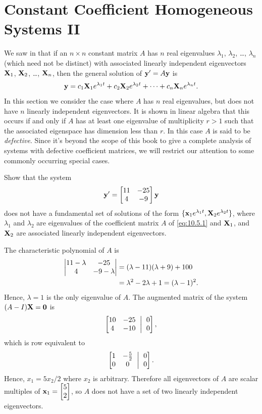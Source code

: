 \section{Constant Coefficient Homogeneous Systems II}
\label{sec:system_const_coeff_ii}

We saw in  that if an $n\times n$
constant matrix
$A$ has $n$ real eigenvalues $\lambda_1$, $\lambda_2$, \dots, $\lambda_n$
(which need not be distinct) with associated linearly independent
eigenvectors $\mathbf{X}_1$, $\mathbf{X}_2$, \dots, $\mathbf{X}_n$, then the general
solution of $\mathbf{y}'=A\mathbf{y}$ is
\[
\mathbf{y}=c_1\mathbf{X}_1e^{\lambda_1t}+c_2\mathbf{X}_2e^{\lambda_2 t}
+\cdots+c_n\mathbf{X}_ne^{\lambda_n t}.
\]
In this section we consider the case where $A$ has $n$ real
eigenvalues, but does not have $n$ linearly independent eigenvectors.
It is shown in linear algebra that this occurs if and only if $A$ has
at least one eigenvalue of multiplicity $r>1$ such that the associated
eigenspace has dimension less than $r$. In this case $A$ is said to be
\emph{\color{blue}defective}. Since it's beyond the scope of this book to give a
complete analysis of systems with defective coefficient matrices, we
will restrict our attention to some commonly occurring special cases.

\begin{example}\label{example:10.5.1}
Show that the system
\begin{equation}\label{eq:10.5.1}
\mathbf{y}'=\begin{bmatrix}11&-25\\4&-9\end{bmatrix}\mathbf{y}
\end{equation}
does not have a fundamental set of solutions of the form $\{\mathbf{x}_1e^{\lambda_1t},\mathbf{X}_2e^{\lambda_2t}\}$, where $\lambda_1$ and
$\lambda_2$ are eigenvalues of the coefficient matrix $A$ of
\eqref{eq:10.5.1} and $\mathbf{X}_1$, and $\mathbf{X}_2$ are associated
linearly independent eigenvectors.
\end{example}

\begin{solution}
The characteristic polynomial of $A$ is
\begin{align*}
\begin{vmatrix}11-\lambda&-25\\4&-9-\lambda\end{vmatrix}
&=(\lambda-11)(\lambda+9)+100\\
&=\lambda^2-2\lambda+1=(\lambda-1)^2.
\end{align*}
Hence, $\lambda=1$ is the only eigenvalue of $A$. The augmented
matrix of the system $(A-I)\mathbf{X}=\mathbf{0}$ is
\[
\amatrix{10&-25\\4&-10}{0\\0},
\]
which is row equivalent to
\[
\amatrix{1&-\frac52\\0&0}{0\\0}.
\]
Hence, $x_1=5x_2/2$ where $x_2$ is arbitrary. Therefore all
eigenvectors of $A$ are scalar multiples of $\mathbf{x}_1=\begin{bmatrix}5\\2\end{bmatrix}$,
so $A$ does not have a set of two linearly independent eigenvectors.
\end{solution}

